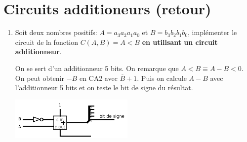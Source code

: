 \documentclass[a4paper,10pt]{exam}
\begin{document}
\section{Circuits additioneurs (retour)}
\begin{enumerate}
\item Soit deux nombres positifs: $A=a_3a_2a_1a_0$ et $B=b_3b_2b_1b_0$, implémenter
  le circuit de la fonction $C(A,B) = A < B$ \textbf{en utilisant un circuit
    additionneur}.
  \begin{solution}
    On se sert d'un additionneur 5 bits.
    On remarque que $A < B \equiv A - B < 0$.
    On peut obtenir $-B$ en CA2 avec $\overline{B} + 1$.
    Puis on calcule $A-B$ avec l'additionneur 5 bits et on teste le bit de signe
    du résultat.

    \includegraphics[width=6cm]{comparateur}

  \end{solution}
\end{enumerate}
\end{document}
